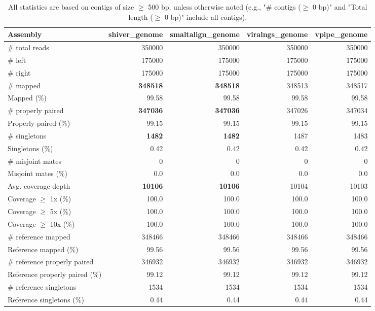 \documentclass[12pt,a4paper]{article}
\begin{document}
\begin{table}[ht]
\begin{center}
\caption{All statistics are based on contigs of size $\geq$ 500 bp, unless otherwise noted (e.g., "\# contigs ($\geq$ 0 bp)" and "Total length ($\geq$ 0 bp)" include all contigs).}
\begin{tabular}{|l*{4}{|r}|}
\hline
Assembly & shiver\_genome & smaltalign\_genome & viralngs\_genome & vpipe\_genome \\ \hline
\# total reads & 350000 & 350000 & 350000 & 350000 \\ \hline
\# left & 175000 & 175000 & 175000 & 175000 \\ \hline
\# right & 175000 & 175000 & 175000 & 175000 \\ \hline
\# mapped & {\bf 348518} & {\bf 348518} & 348513 & 348517 \\ \hline
Mapped (\%) & 99.58 & 99.58 & 99.58 & 99.58 \\ \hline
\# properly paired & {\bf 347036} & {\bf 347036} & 347026 & 347034 \\ \hline
Properly paired (\%) & 99.15 & 99.15 & 99.15 & 99.15 \\ \hline
\# singletons & {\bf 1482} & {\bf 1482} & 1487 & 1483 \\ \hline
Singletons (\%) & 0.42 & 0.42 & 0.42 & 0.42 \\ \hline
\# misjoint mates & 0 & 0 & 0 & 0 \\ \hline
Misjoint mates (\%) & 0.0 & 0.0 & 0.0 & 0.0 \\ \hline
Avg. coverage depth & {\bf 10106} & {\bf 10106} & 10104 & 10103 \\ \hline
Coverage $\geq$ 1x (\%) & 100.0 & 100.0 & 100.0 & 100.0 \\ \hline
Coverage $\geq$ 5x (\%) & 100.0 & 100.0 & 100.0 & 100.0 \\ \hline
Coverage $\geq$ 10x (\%) & 100.0 & 100.0 & 100.0 & 100.0 \\ \hline
\# reference mapped & 348466 & 348466 & 348466 & 348466 \\ \hline
Reference mapped (\%) & 99.56 & 99.56 & 99.56 & 99.56 \\ \hline
\# reference properly paired & 346932 & 346932 & 346932 & 346932 \\ \hline
Reference properly paired (\%) & 99.12 & 99.12 & 99.12 & 99.12 \\ \hline
\# reference singletons & 1534 & 1534 & 1534 & 1534 \\ \hline
Reference singletons (\%) & 0.44 & 0.44 & 0.44 & 0.44 \\ \hline

\end{tabular}
\end{center}
\end{table}
\end{document}
